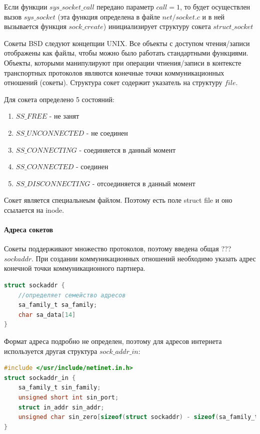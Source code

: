 

Если функции $sys\_socket\_call$ передано параметр $call = 1$, то будет осуществлен вызов $sys\_socket$ (эта функция определена в файле $net/socket.c$ и в ней вызывается функция $sock\_create$) инициализирует структуру сокета $struct\_socket$

 

Сокеты BSD следуют концепции UNIX. Все объекты с доступом чтения/записи отображены как файлы, чтобы можно было работать стандартными функциями. Объекты, которыми манипулируют при операции чтиения/записи в контексте транспортных протоколов являются конечные точки коммуникационных отношений (сокеты). 
Структура сокет содержит указатель на структуру $file$. 

Для сокета определено 5 состояний:
\begin{enumerate}
	\item $SS\_FREE$ - не занят
	\item $SS\_UNCONNECTED$ - не соединен
	\item $SS\_CONNECTING$ - соединяется в данный момент
	\item $SS\_CONNECTED$ - соединен
	\item $SS\_DISCONNECTING$ - отсоединяется в данный момент
\end{enumerate}

Сокет является специальнеым файлом. Поэтому есть поле struct file и оно ссылается на inode. 

\paragraph{Адреса сокетов}

Сокеты поддерживают множество протоколов, поэтому введена общая ??? $sockaddr$. При создании коммуникационных отношений необходимо указать адрес конечной точки коммуникационного партнера. 

\begin{lstlisting}[language=c, caption = Структура sockaddr]
struct sockaddr {
	//определяет семейство адресов
	sa_family_t sa_family;
	char sa_data[14]
}
\end{lstlisting}

Формат адреса подробно не определен, поэтому для адресов интернета используется другая структура $sock\_addr\_in$:

\begin{lstlisting}[language=c]
#include </usr/include/netinet.in.h>
struct sockaddr_in {
	sa_family_t sin_family;
	unsigned short int sin_port;
	struct in_addr sin_addr;
	unsigned char sin_zero[sizeof(struct sockaddr) - sizeof(sa_family_t) - sizeof(uint16_t) - sizeof(struct in_addr)];
}
\end{lstlisting}

